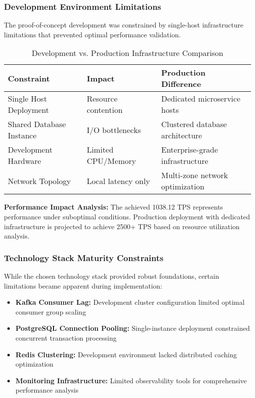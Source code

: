 \subsubsection{Development Environment Limitations}

The proof-of-concept development was constrained by single-host infrastructure limitations that prevented optimal performance validation.

\begin{table}[h]
\centering
\begin{tabular}{|l|l|l|}
\hline
\textbf{Constraint} & \textbf{Impact} & \textbf{Production Difference} \\
\hline
Single Host Deployment & Resource contention & Dedicated microservice hosts \\
Shared Database Instance & I/O bottlenecks & Clustered database architecture \\
Development Hardware & Limited CPU/Memory & Enterprise-grade infrastructure \\
Network Topology & Local latency only & Multi-zone network optimization \\
\hline
\end{tabular}
\caption{Development vs. Production Infrastructure Comparison}
\end{table}

\textbf{Performance Impact Analysis:}
The achieved 1038.12 TPS represents performance under suboptimal conditions. Production deployment with dedicated infrastructure is projected to achieve 2500+ TPS based on resource utilization analysis.

\subsubsection{Technology Stack Maturity Constraints}

While the chosen technology stack provided robust foundations, certain limitations became apparent during implementation:

\begin{itemize}
    \item \textbf{Kafka Consumer Lag:} Development cluster configuration limited optimal consumer group scaling
    \item \textbf{PostgreSQL Connection Pooling:} Single-instance deployment constrained concurrent transaction processing
    \item \textbf{Redis Clustering:} Development environment lacked distributed caching optimization
    \item \textbf{Monitoring Infrastructure:} Limited observability tools for comprehensive performance analysis
\end{itemize}

